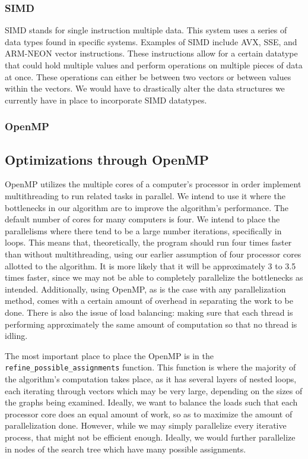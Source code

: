 \documentclass{article}
\begin{document}
    \subsubsection{SIMD}
    SIMD stands for single instruction multiple data. This system uses a series of data types found in specific systems. Examples of SIMD include AVX, SSE, and ARM-NEON vector instructions. These instructions allow for a certain datatype that could hold multiple values and perform operations on multiple pieces of data at once. These operations can either be between two vectors or between values within the vectors. We would have to drastically alter the data structures we currently have in place to incorporate SIMD datatypes.

    \subsubsection{OpenMP}

  \subsection{Optimizations through OpenMP}
  OpenMP utilizes the multiple cores of a computer's processor in order implement multithreading to run related tasks in parallel. We intend to use it where the bottlenecks in our algorithm are to improve the algorithm's performance. The default number of cores for many computers is four. We intend to place the parallelisms where there tend to be a large number iterations, specifically in loops. This means that, theoretically, the program should run four times faster than without multithreading, using our earlier assumption of four processor cores allotted to the algorithm. It is more likely that it will be approximately 3 to 3.5 times faster, since we may not be able to completely parallelize the bottlenecks as intended. Additionally, using OpenMP, as is the case with any parallelization method, comes with a certain amount of overhead in separating the work to be done. There is also the issue of load balancing: making sure that each thread is performing approximately the same amount of computation so that no thread is idling.

  The most important place to place the OpenMP is in the \texttt{refine\_possible\_assignments} function. This function is where the majority of the algorithm's computation takes place, as it has several layers of nested loops, each iterating through vectors which may be very large, depending on the sizes of the graphs being examined. Ideally, we want to balance the loads such that each processor core does an equal amount of work, so as to maximize the amount of parallelization done. However, while we may simply parallelize every iterative process, that might not be efficient enough. Ideally, we would further parallelize in nodes of the search tree which have many possible assignments.
\end{document}
